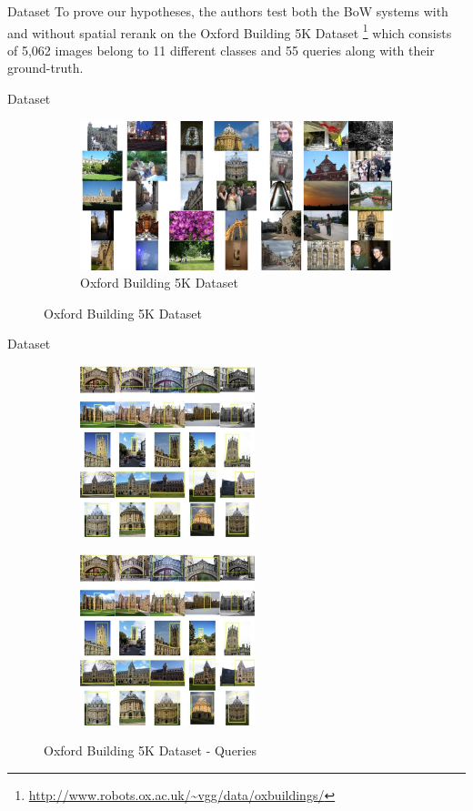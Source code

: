 \begin{frame}{Dataset}
  To prove our hypotheses, the authors test both the BoW systems with and without spatial rerank on the \alert{Oxford Building 5K Dataset} \footnote{\url{http://www.robots.ox.ac.uk/~vgg/data/oxbuildings/}} which consists of 5,062 images belong to 11 different classes and 55 queries along with their ground-truth.

  
\end{frame}

\begin{frame}{Dataset}
  \begin{figure}
    \begin{figure}{}
        \centering
        \includegraphics[width=4.0in]{images/oxbuilding.jpg}
        \caption{Oxford Building 5K Dataset}
    \end{figure}
  \end{figure}
\end{frame}

\begin{frame}{Dataset}
  \begin{figure}
    \centering
    \begin{subfigure}{}
        \includegraphics[width=2.0in]{images/query_2.png}
    \end{subfigure}
    \begin{subfigure}{}
        \includegraphics[width=2.0in]{images/query_2.png}
    \end{subfigure}
    \caption{Oxford Building 5K Dataset - Queries}
  \end{figure}

\end{frame}

